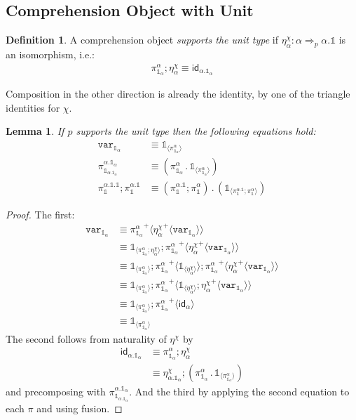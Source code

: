 \documentclass[10pt]{article}
\newtheorem{lemma}{Lemma}
\theoremstyle{definition}
\newtheorem{definition}{Definition}
\newcommand{\tcell}{\Rightarrow}
\newcommand{\id}{\mathsf{id}}
\newcommand\bdot[0]{\mathbin{.}}
\newcommand\ApPlus[2]{\ensuremath{{#1}^+ \langle #2 \rangle }}
\newcommand\One{\ensuremath{\mathds{1}}}
\newcommand\var[1]{\ensuremath{\mathtt{var}_{#1}}}
\newcommand\ApOne[1]{\ensuremath{\One_{\langle {#1} \rangle }}}
\begin{document}
\subsection{Comprehension Object with Unit}

\begin{definition}
A comprehension object \emph{supports the unit type} if $\eta^\chi_\alpha : \alpha \tcell_p \alpha.\One$ is an isomorphism, i.e.:
\begin{align}
\pi^\alpha_{\One_\alpha} ; \eta^\chi_\alpha \equiv \id_{\alpha.\One_\alpha}
\end{align}
\end{definition}
Composition in the other direction is already the identity, by one of the triangle identities for $\chi$.

\begin{lemma}
If $p$ supports the unit type then the following equations hold:
\begin{align}
\var{\One_\alpha} &\equiv \ApOne{\pi^\alpha_{\One_\alpha}} \\
\pi^{\alpha.\One_\alpha}_{\One_{\alpha.\One_\alpha}} &\equiv (\pi^\alpha_{\One_\alpha} \bdot \ApOne{\pi^\alpha_{\One_\alpha}}) \\
\pi^{\alpha.\One.\One}_\One;\pi^{\alpha.\One}_\One &\equiv (\pi^{\alpha.\One}_\One;\pi^{\alpha}_\One) \bdot (\ApOne{\pi^{\alpha.\One}_\One;\pi^{\alpha}_\One})
\end{align}
\end{lemma}
\begin{proof}
The first:
\begin{align*}
\var{\One_\alpha} 
&\equiv \ApPlus{\pi^\alpha_{\One_\alpha}}{\ApPlus{\eta^\chi_\alpha}{\var{\One_\alpha}}} \\
&\equiv \ApOne{\pi^\alpha_{\One_\alpha} ; \eta^\chi_\alpha};\ApPlus{\pi^\alpha_{\One_\alpha}}{\ApPlus{\eta^\chi_\alpha}{\var{\One_\alpha}}} \\
&\equiv \ApOne{\pi^\alpha_{\One_\alpha}};\ApPlus{\pi^\alpha_{\One_\alpha}}{\ApOne{\eta^\chi_\alpha}};\ApPlus{\pi^\alpha_{\One_\alpha}}{\ApPlus{\eta^\chi_\alpha}{\var{\One_\alpha}}} \\
&\equiv \ApOne{\pi^\alpha_{\One_\alpha}};\ApPlus{\pi^\alpha_{\One_\alpha}}{\ApOne{\eta^\chi_\alpha};\ApPlus{\eta^\chi_\alpha}{\var{\One_\alpha}}} \\
&\equiv \ApOne{\pi^\alpha_{\One_\alpha}};\ApPlus{\pi^\alpha_{\One_\alpha}}{\id_{\alpha}} \\
&\equiv \ApOne{\pi^\alpha_{\One_\alpha}}
\end{align*}
The second follows from naturality of $\eta^\chi$ by
\begin{align*}
\id_{\alpha.\One_\alpha} 
&\equiv \pi^\alpha_{\One_\alpha} ; \eta^\chi_\alpha \\
&\equiv \eta^\chi_{\alpha.\One_\alpha} ; (\pi^\alpha_{\One_\alpha} \bdot \ApOne{\pi^\alpha_{\One_\alpha}})
\end{align*}
and precomposing with $\pi^{\alpha.\One_\alpha}_{\One_{\alpha.\One_\alpha}}$.
And the third by applying the second equation to each $\pi$ and using fusion.
\end{proof}
\end{document}
